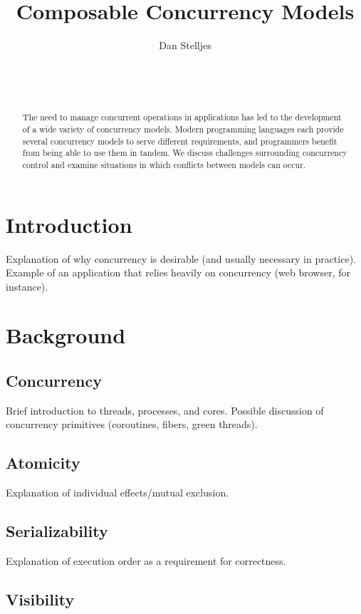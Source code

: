 \documentclass{sig-alternate}
\author{
\alignauthor{}
Dan Stelljes\\
  \affaddr{Division of Science and Mathematics}\\
  \affaddr{University of Minnesota, Morris}\\
  \affaddr{Morris, Minnesota, USA 56267}\\
  \email{stell124@morris.umn.edu}
}
\title{Composable Concurrency Models}
\begin{document}
\maketitle

\begin{abstract}

The need to manage concurrent operations in applications has led to the development of a wide variety of concurrency models. Modern programming languages each provide several concurrency models to serve different requirements, and programmers benefit from being able to use them in tandem. We discuss challenges surrounding concurrency control and examine situations in which conflicts between models can occur.

\end{abstract}

\section{Introduction}

Explanation of why concurrency is desirable (and usually necessary in practice). Example of an application that relies heavily on concurrency (web browser, for instance).

\section{Background}

\subsection{Concurrency}

Brief introduction to threads, processes, and cores. Possible discussion of concurrency primitives (coroutines, fibers, green threads).

\subsection{Atomicity}

Explanation of individual effects/mutual exclusion.

\subsection{Serializability}

Explanation of execution order as a requirement for correctness.

\subsection{Visibility}
\end{document}
